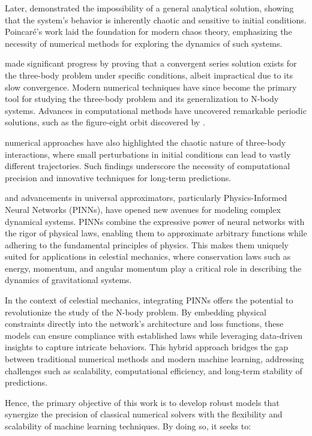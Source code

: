 \documentclass[draft]{agujournal2019}
\begin{document}
Later, \cite{poincare1892} demonstrated the impossibility of a general analytical solution, showing that the system's behavior is inherently chaotic and sensitive to initial conditions. Poincaré’s work laid the foundation for modern chaos theory, emphasizing the necessity of numerical methods for exploring the dynamics of such systems.

\cite{sundman1912} made significant progress by proving that a convergent series solution exists for the three-body problem under specific conditions, albeit impractical due to its slow convergence. Modern numerical techniques have since become the primary tool for studying the three-body problem and its generalization to N-body systems. Advances in computational methods have uncovered remarkable periodic solutions, such as the figure-eight orbit discovered by \cite{chenciner2000}.

\cite{laskar1994} numerical approaches have also highlighted the chaotic nature of three-body interactions, where small perturbations in initial conditions can lead to vastly different trajectories. Such findings underscore the necessity of computational precision and innovative techniques for long-term predictions.

\cite{raissi2017physicsinformeddeeplearning} and \cite{li2023physicsinformedneuraloperatorlearning} advancements in universal approximators, particularly Physics-Informed Neural Networks (PINNs), have opened new avenues for modeling complex dynamical systems. PINNs combine the expressive power of neural networks with the rigor of physical laws, enabling them to approximate arbitrary functions while adhering to the fundamental principles of physics. This makes them uniquely suited for applications in celestial mechanics, where conservation laws such as energy, momentum, and angular momentum play a critical role in describing the dynamics of gravitational systems.

In the context of celestial mechanics, integrating PINNs offers the potential to revolutionize the study of the N-body problem. By embedding physical constraints directly into the network's architecture and loss functions, these models can ensure compliance with established laws while leveraging data-driven insights to capture intricate behaviors. This hybrid approach bridges the gap between traditional numerical methods and modern machine learning, addressing challenges such as scalability, computational efficiency, and long-term stability of predictions.

Hence, the primary objective of this work is to develop robust models that synergize the precision of classical numerical solvers with the flexibility and scalability of machine learning techniques. By doing so, it seeks to:
\end{document}
